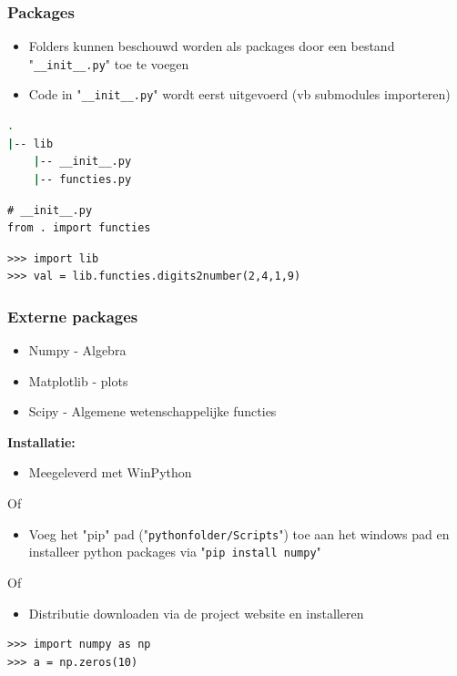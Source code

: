 \documentclass[t]{beamer}
\begin{document}
\begin{frame}[fragile]
	\frametitle{Packages}
	\begin{itemize}
		\item Folders kunnen beschouwd worden als packages door een bestand "\lstinline{__init__.py}" toe te voegen
		\item Code in "\lstinline{__init__.py}" wordt eerst uitgevoerd (vb submodules importeren)
	\end{itemize}
	
	\vspace{0.5cm}	
	\begin{lstlisting}[language=bash]
.	
|-- lib
    |-- __init__.py
    |-- functies.py
	\end{lstlisting}
	
	\vspace{0.2cm}
	\begin{lstlisting}
# __init__.py
from . import functies
	\end{lstlisting}
			
	\vspace{0.2cm}
	\begin{lstlisting}
>>> import lib
>>> val = lib.functies.digits2number(2,4,1,9)
	\end{lstlisting}	
	
\end{frame}
\begin{frame}[fragile]
	\frametitle{Externe packages}
	
	\begin{itemize}
		\item Numpy - Algebra
        \item Matplotlib - plots
        \item Scipy - Algemene wetenschappelijke functies
	\end{itemize}
	
    \textbf{Installatie:}
    \begin{itemize}
        \item Meegeleverd met WinPython
    \end{itemize}
	Of
    \begin{itemize}
    	\item Voeg het "pip" pad ("\lstinline[language=bash]{pythonfolder/Scripts}") toe aan het windows pad en installeer python packages via "\lstinline[language=bash]{pip install numpy}"
	\end{itemize}
	Of
	\begin{itemize}
        \item Distributie downloaden via de project website en installeren
	\end{itemize}
	
	\vspace{0.2cm}
	\begin{lstlisting}
>>> import numpy as np
>>> a = np.zeros(10)
	\end{lstlisting}
\end{frame}
\end{document}
